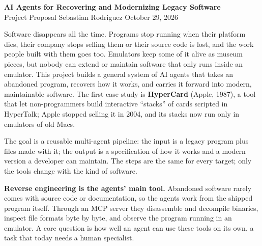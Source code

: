 \documentclass[10pt]{article}
\newcommand{\sect}[1]{\vspace{3pt}{\large\bfseries #1}\par\vspace{1pt}}
\begin{document}
\begin{center}
  {\Large\bfseries AI Agents for Recovering and Modernizing Legacy Software}\\[3pt]
  Project Proposal \quad\textbullet\quad Sebastian Rodriguez \quad\textbullet\quad October 29, 2026
\end{center}

\sect{Motivation}
Software disappears all the time. Programs stop running when their platform dies, their company
stops selling them or their source code is lost, and the work people built with them goes too.
Emulators keep some of it alive as museum pieces, but nobody can extend or maintain software that
only runs inside an emulator. This project builds a general system of AI agents that takes an
abandoned program, recovers how it works, and carries it forward into modern, maintainable software.
The first case study is \textbf{HyperCard} (Apple, 1987), a tool that let non-programmers build
interactive ``stacks'' of cards scripted in HyperTalk; Apple stopped selling it in 2004, and its
stacks now run only in emulators of old Macs.

\sect{Goal and approach}
The goal is a reusable multi-agent pipeline: the input is a legacy program plus files made with it;
the output is a specification of how it works and a modern version a developer can maintain. The
steps are the same for every target; only the tools change with the kind of software.

\textbf{Reverse engineering is the agents' main tool.} Abandoned software rarely comes with source
code or documentation, so the agents work from the shipped program itself. Through an MCP server
they disassemble and decompile binaries, inspect file formats byte by byte, and observe the program
running in an emulator. A core question is how well an agent can use these tools on its own, a task
that today needs a human specialist.
\end{document}
